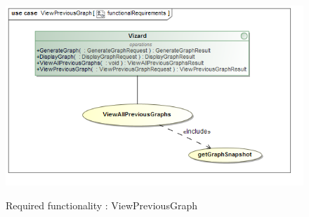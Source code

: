 \documentclass[a4paper,12pt]{article}
\begin{document}
	\begin{figure}[H]
		\includegraphics[width=\textwidth]{Images/uc__ViewPreviousGraph__functionalRequirements.png}  \\
		\caption{Required functionality : ViewPreviousGraph}
	\end{figure}	
\end{document}
